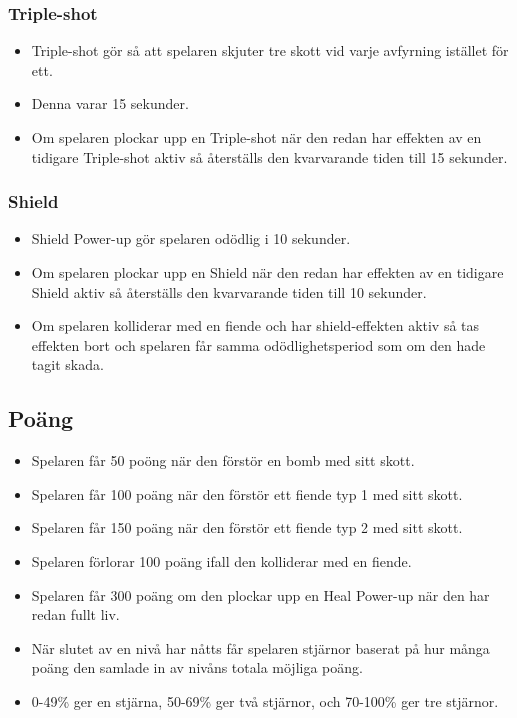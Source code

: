 \documentclass{TDP005mall}
\begin{document}
\subsubsection*{Triple-shot}
\begin{itemize}
\item Triple-shot gör så att spelaren skjuter tre skott vid varje avfyrning istället för ett.
\item Denna varar 15 sekunder.
\item Om spelaren plockar upp en Triple-shot när den redan har effekten av en tidigare Triple-shot aktiv så återställs den kvarvarande tiden till 15 sekunder.
\end{itemize}

\subsubsection*{Shield}
\begin{itemize}
\item Shield Power-up gör spelaren odödlig i 10 sekunder.
\item Om spelaren plockar upp en Shield när den redan har effekten av en tidigare Shield aktiv så återställs den kvarvarande tiden till 10 sekunder.
\item Om spelaren kolliderar med en fiende och har shield-effekten aktiv så tas effekten bort och spelaren får samma odödlighetsperiod som om den hade tagit skada.  
\end{itemize}


\subsection{Poäng}
\begin{itemize}
\item Spelaren får 50 poöng när den förstör en bomb med sitt skott.
\item Spelaren får 100 poäng när den förstör ett fiende typ 1 med sitt skott.
\item Spelaren får 150 poäng när den förstör ett fiende typ 2 med sitt skott.
\item Spelaren förlorar 100 poäng ifall den kolliderar med en fiende.
\item Spelaren får 300 poäng om den plockar upp en Heal Power-up när den har redan fullt liv.
\item När slutet av en nivå har nåtts får spelaren stjärnor baserat på hur många poäng den samlade in av nivåns totala möjliga poäng.
\item 0-49\% ger en stjärna, 50-69\% ger två stjärnor, och 70-100\% ger tre stjärnor.
\end{itemize}
\end{document}
